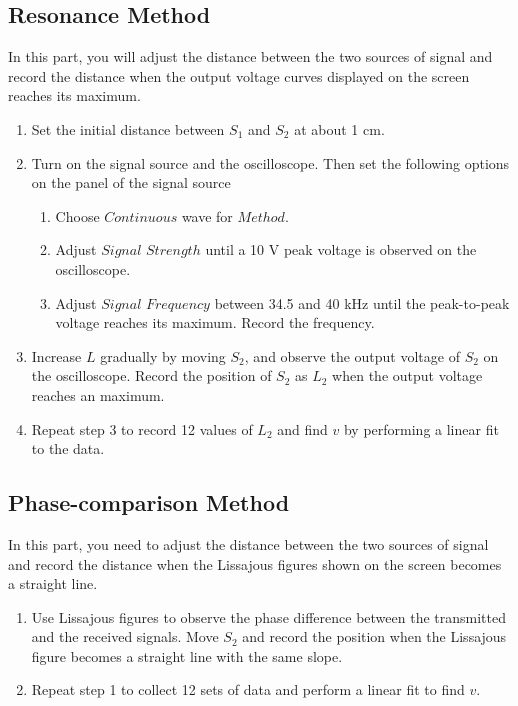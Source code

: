 \documentclass[a4paper]{article}
\begin{document}
\subsection{Resonance Method}
\noindent In this part, you will adjust the distance between the two sources of signal and record the distance when the output voltage curves displayed on the screen reaches its maximum.

\begin{enumerate}
\item Set the initial distance between $S_1$ and $S_2$ at about 1 cm.
\item  Turn on the signal source and the oscilloscope. Then set the following options on the panel of the signal source
	\begin{enumerate}[(1)]
	\item Choose $Continuous$ wave for $Method$. 
	\item Adjust $Signal \,\,Strength$ until a 10 V peak voltage is observed on the oscilloscope. 
	\item Adjust $Signal \,\,Frequency$ between 34.5 and 40 kHz until the peak-to-peak voltage reaches its maximum. Record the frequency.
	\end{enumerate}
\item Increase $L$ gradually by moving $S_2$, and observe the output voltage of $S_2$ on the oscilloscope. Record the position of $S_2$ as $L_2$ when the output voltage reaches an maximum.
\item Repeat step 3 to record 12 values of $L_2$ and find $v$ by performing a linear fit to the data.
\end{enumerate}

\subsection{Phase-comparison Method}
\noindent In this part, you need to adjust the distance between the two sources of signal and record the distance when the Lissajous figures shown on the screen becomes a straight line.

\begin{enumerate}
\item Use Lissajous figures to observe the phase difference between the transmitted and the received signals. Move $S_2$ and record the position when the Lissajous figure becomes a straight line with the same slope.
\item Repeat step 1 to collect 12 sets of data and perform a linear fit to find $v$.
\end{enumerate}
\end{document}

